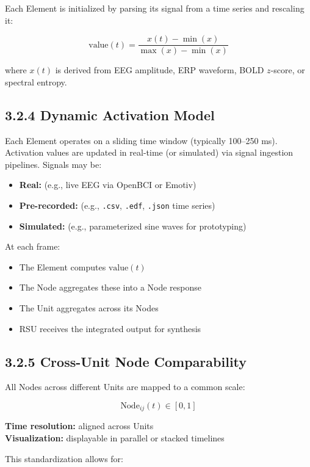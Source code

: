 \documentclass[10pt]{article}
\begin{document}
Each Element is initialized by parsing its signal from a time series and rescaling it:

\[
\text{value}(t) = \frac{x(t) - \min(x)}{\max(x) - \min(x)}
\]

where $x(t)$ is derived from EEG amplitude, ERP waveform, BOLD $z$-score, or spectral entropy.

\subsection*{3.2.4 Dynamic Activation Model}

Each Element operates on a sliding time window (typically 100–250 ms). Activation values are updated in real-time (or simulated) via signal ingestion pipelines. Signals may be:

\begin{itemize}
    \item \textbf{Real:} (e.g., live EEG via OpenBCI or Emotiv)
    \item \textbf{Pre-recorded:} (e.g., \texttt{.csv}, \texttt{.edf}, \texttt{.json} time series)
    \item \textbf{Simulated:} (e.g., parameterized sine waves for prototyping)
\end{itemize}

At each frame:

\begin{itemize}
    \item The Element computes $\text{value}(t)$
    \item The Node aggregates these into a Node response
    \item The Unit aggregates across its Nodes
    \item RSU receives the integrated output for synthesis
\end{itemize}

\subsection*{3.2.5 Cross-Unit Node Comparability}

All Nodes across different Units are mapped to a common scale:

\[
\text{Node}_{ij}(t) \in [0, 1]
\]

\textbf{Time resolution:} aligned across Units\\
\textbf{Visualization:} displayable in parallel or stacked timelines

This standardization allows for:
\end{document}
